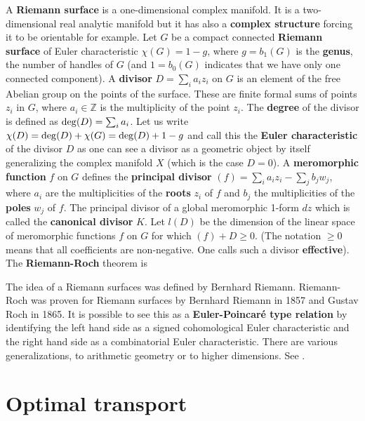 \documentclass[12pt]{amsart}
\def\satz#1{ \vspace{2mm} \begin{center} \fcolorbox{yellow1}{yellow1}{ \parbox{14.0cm}{{\bf Theorem:} #1}} \vspace{2mm} \end{center} }
\newcounter{example}    \def\example#1{ \item \fontsize{12}{15} \selectfont #1 \fontsize{12}{15} \selectfont }
\begin{document}
A {\bf Riemann surface} is a one-dimensional complex manifold. It is a two-dimensional real analytic
manifold but it has also a {\bf complex structure} forcing it to be orientable for example. 
Let $G$ be a compact connected {\bf Riemann surface} of Euler characteristic 
$\chi(G)=1-g$, where $g=b_1(G)$ is the {\bf genus}, the number of handles of $G$ (and $1=b_0(G)$
indicates that we have only one connected component). 
A {\bf divisor} $D=\sum_i a_i z_i$ on $G$ is an element of the
free Abelian group on the points of the surface. These are finite formal sums of points $z_i$ in $G$,
where $a_i \in \mathbb{Z}$ is the multiplicity of the point $z_i$. The {\bf degree} of the divisor
is defined as ${\rm deg}(D)=\sum_i a_i$. Let us write $\chi(D)={\rm deg}(D) + \chi(G)= {\rm deg}(D)+1-g$ and 
call this the {\bf Euler characteristic} of the divisor $D$ as one can see a divisor as a geometric
object by itself generalizing the complex manifold $X$ (which is the case $D=0$). 
A {\bf meromorphic function} $f$ on $G$ defines the {\bf principal divisor}
$(f)=\sum_i a_i z_i - \sum_j b_j w_j$, where $a_i$ are the multiplicities of the {\bf roots}
$z_i$ of $f$ and $b_j$ the multiplicities of the {\bf poles} $w_j$ of $f$. The principal divisor
of a global meromorphic 1-form $dz$ which is called the {\bf canonical divisor} $K$.
Let $l(D)$ be the dimension of the linear space of meromorphic functions $f$ on $G$ for which
$(f) + D \geq 0$. (The notation $\geq 0$ means that all coefficients are non-negative. 
One calls such a divisor {\bf effective}). The {\bf Riemann-Roch} theorem is

\satz{$l(D) - l(K-D) = \chi(D)$}

The idea of a Riemann surfaces was defined by Bernhard Riemann.
Riemann-Roch was proven for Riemann surfaces by Bernhard Riemann in 1857 and Gustav Roch in 1865.
It is possible to see this as a {\bf Euler-Poincar\'e type relation} by identifying the left
hand side as a signed cohomological Euler characteristic and the right hand side as 
a combinatorial Euler characteristic. There are various generalizations, to 
arithmetic geometry or to higher dimensions. See \cite{GriffithsHarris,Schenk}.

\section{Optimal transport}
\end{document}
